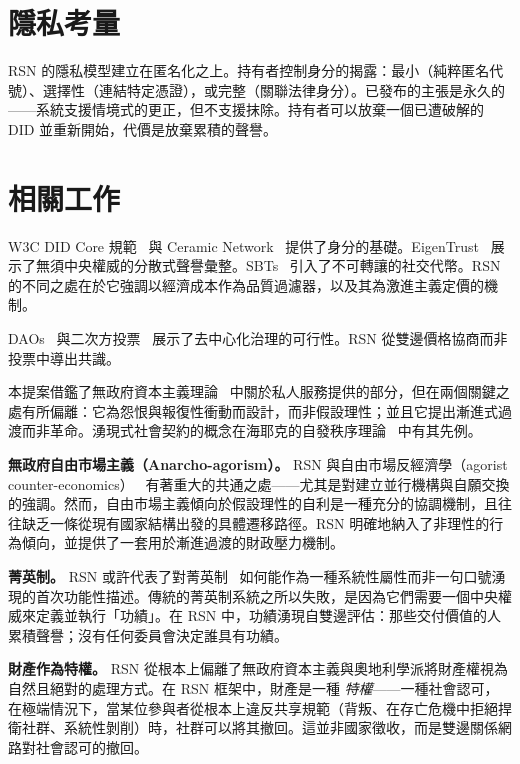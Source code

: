 \documentclass[11pt,a4paper,twocolumn]{article}
\begin{document}
\section{隱私考量}

RSN 的隱私模型建立在匿名化之上。持有者控制身分的揭露：最小（純粹匿名代號）、選擇性（連結特定憑證），或完整（關聯法律身分）。已發布的主張是永久的——系統支援情境式的更正，但不支援抹除。持有者可以放棄一個已遭破解的 DID 並重新開始，代價是放棄累積的聲譽。

\section{相關工作}

W3C DID Core 規範~\cite{did2022} 與 Ceramic Network~\cite{ceramic2023} 提供了身分的基礎。EigenTrust~\cite{kamvar2003} 展示了無須中央權威的分散式聲譽彙整。SBTs~\cite{weyl2022} 引入了不可轉讓的社交代幣。RSN 的不同之處在於它強調以經濟成本作為品質過濾器，以及其為激進主義定價的機制。

DAOs~\cite{buterin2014} 與二次方投票~\cite{buterin2019} 展示了去中心化治理的可行性。RSN 從雙邊價格協商而非投票中導出共識。

本提案借鑑了無政府資本主義理論~\cite{rothbard1973,hoppe2001} 中關於私人服務提供的部分，但在兩個關鍵之處有所偏離：它為怨恨與報復性衝動而設計，而非假設理性；並且它提出漸進式過渡而非革命。湧現式社會契約的概念在海耶克的自發秩序理論~\cite{hayek1973} 中有其先例。

\textbf{無政府自由市場主義（Anarcho-agorism）。} RSN 與自由市場反經濟學（agorist counter-economics）~\cite{konkin2006} 有著重大的共通之處——尤其是對建立並行機構與自願交換的強調。然而，自由市場主義傾向於假設理性的自利是一種充分的協調機制，且往往缺乏一條從現有國家結構出發的具體遷移路徑。RSN 明確地納入了非理性的行為傾向，並提供了一套用於漸進過渡的財政壓力機制。

\textbf{菁英制。} RSN 或許代表了對菁英制~\cite{young1958} 如何能作為一種系統性屬性而非一句口號湧現的首次功能性描述。傳統的菁英制系統之所以失敗，是因為它們需要一個中央權威來定義並執行「功績」。在 RSN 中，功績湧現自雙邊評估：那些交付價值的人累積聲譽；沒有任何委員會決定誰具有功績。

\textbf{財產作為特權。} RSN 從根本上偏離了無政府資本主義與奧地利學派將財產權視為自然且絕對的處理方式。在 RSN 框架中，財產是一種 \emph{特權}——一種社會認可，在極端情況下，當某位參與者從根本上違反共享規範（背叛、在存亡危機中拒絕捍衛社群、系統性剝削）時，社群可以將其撤回。這並非國家徵收，而是雙邊關係網路對社會認可的撤回。
\end{document}
